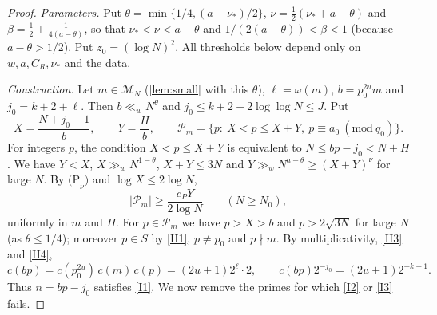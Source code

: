 \documentclass[11pt]{article}
\newcommand{\Mset}{\mathcal M}
\newcommand{\Pset}{\mathcal P}
\begin{document}
\begin{proof}
\emph{Parameters.} Put $\theta=\min\{1/4,(a-\nu_*)/2\}$,
$\nu=\frac12(\nu_*+a-\theta)$ and $\beta=\frac12+\frac1{4(a-\theta)}$, so that
$\nu_*<\nu<a-\theta$ and $1/(2(a-\theta))<\beta<1$ (because $a-\theta>1/2$). Put
$z_0=(\log N)^2$. All thresholds below depend only on $w,a,C_R,\nu_*$ and the data.

\emph{Construction.} Let $m\in\Mset_N$ (\cref{lem:small} with this $\theta$),
$\ell=\omega(m)$, $b=p_0^{2u}m$ and $j_0=k+2+\ell$. Then $b\ll_wN^\theta$ and
$j_0\le k+2+2\log\log N\le J$. Put
\[
X=\frac{N+j_0-1}{b},\qquad Y=\frac Hb,\qquad
\Pset_m=\{p:\ X<p\le X+Y,\ p\equiv a_0\ (\mathrm{mod}\ q_0)\}.
\]
For integers $p$, the condition $X<p\le X+Y$ is equivalent to
$N\le bp-j_0<N+H$. We have $Y<X$, $X\gg_wN^{1-\theta}$, $X+Y\le3N$ and
$Y\gg_wN^{a-\theta}\ge(X+Y)^\nu$ for large $N$. By $\mathrm{(P}_\nu\mathrm{)}$ and
$\log X\le2\log N$,
\begin{equation}\label{eq:Pm}
|\Pset_m|\ge\frac{c_PY}{2\log N}\qquad(N\ge N_0),
\end{equation}
uniformly in $m$ and $H$. For $p\in\Pset_m$ we have $p>X>b$ and
$p>2\sqrt{3N}$ for large $N$ (as $\theta\le1/4$); moreover $p\in S$ by \ref{H1},
$p\ne p_0$ and $p\nmid m$. By multiplicativity, \ref{H3} and \ref{H4},
\[
c(bp)=c(p_0^{2u})\,c(m)\,c(p)=(2u+1)2^{\ell}\cdot2,\qquad
c(bp)2^{-j_0}=(2u+1)2^{-k-1}.
\]
Thus $n=bp-j_0$ satisfies \ref{I1}. We now remove the primes for which
\ref{I2} or \ref{I3} fails.


\end{proof}
\end{document}

